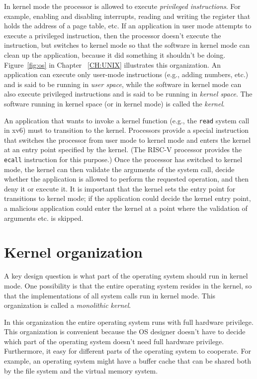 In kernel mode the processor is allowed to execute 
\textit{privileged instructions}.
For example, enabling and disabling interrupts,  reading and writing
the register that holds the address of a page table, etc.
If an application in user mode attempts to execute
a privileged instruction, then the processor doesn't execute the instruction, but switches
to kernel mode so that the software in kernel mode can clean up the application,
because it did something it shouldn't be doing. 
Figure~\ref{fig:os}
in Chapter ~\ref{CH:UNIX} illustrates this organization.  An application can
execute only user-mode instructions (e.g., adding numbers, etc.) and is said to
be running in 
\textit{user space},
while the software in kernel mode can also execute privileged instructions and
is said to be running in
\textit{kernel space}.
The software running in kernel space (or in kernel mode) is called
the
\textit{kernel}.

An application that wants to invoke a kernel function (e.g., the
\lstinline{read}
system call in xv6) must to
transition to the kernel.  Processors provide a special instruction that switches the
processor from user mode to kernel mode and enters the kernel at an entry point
specified by the kernel.  (The RISC-V
processor provides the 
\lstinline{ecall}
instruction for this purpose.)  Once the processor has switched to kernel mode,
the kernel can then validate the arguments of the system call, decide whether
the application is allowed to perform the requested operation, and then deny it
or execute it.  It is important that the kernel sets the entry point for
transitions to kernel mode; if the application could decide the kernel entry
point, a malicious application could enter the kernel at a point where the
validation of arguments etc. is skipped.
\section{Kernel organization}

A key design question is what part of the operating
system should run in kernel mode. 
One possibility is that the entire operating system resides
in the kernel, so that the implementations of all system calls
run in kernel mode.
This organization is called a
\textit{monolithic kernel}.

In this organization the entire operating system runs with full hardware
privilege. This organization is convenient because the OS designer doesn't have
to decide which part of the operating system doesn't need full hardware
privilege.  Furthermore, it easy for different parts of the operating system to
cooperate.  For example, an operating system might have a buffer cache that can
be shared both by the file system and the virtual memory system. 


